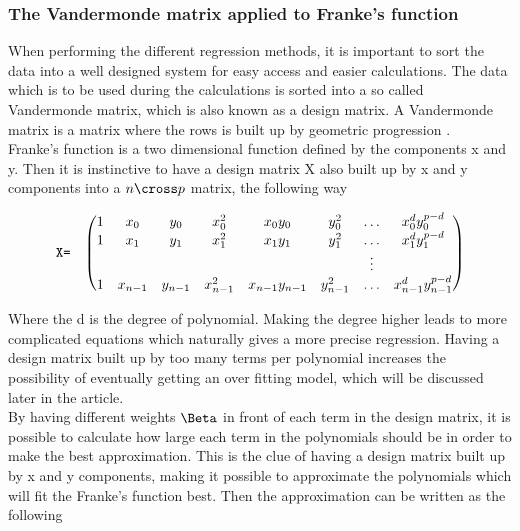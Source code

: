 \subsubsection{The Vandermonde matrix applied to Franke's function}

When performing the different regression methods, it is important to sort the data into a well designed system for easy access and easier calculations. The data which is to be used during the calculations is sorted into a so called Vandermonde matrix, which is also known as a design matrix. A Vandermonde matrix is a matrix where the rows is built up by geometric progression \cite{vandermonde}.\\

Franke's function is a two dimensional function defined by the components x and y. Then it is instinctive to have a design matrix X also built up by x and y components into a $n\cross p$ matrix, the following way

\[
\begin{array}{lccccccc}
  \verb|X=| & \left(\begin{array}{@{}cccccccc@{}}
   1& x_0 & y_0 & x_0^2 & x_0y_0 & y_0^2 & \ldots & x_0^d y_0^{p-d}\\
    1& x_1 & y_1 & x_1^2 & x_1y_1 & y_1^2 & \ldots & x_1^d y_1^{p-d}\\
    & &  &  &  &  & \vdots & \\
    1 & x_{n-1} & y_{n-1} & x_{n-1}^2 & x_{n-1}y_{n-1} & y_{n-1}^2 & \ldots & x_{n-1}^d y_{n-1}^{p-d}\\
 \end{array}\right) \\[15pt]
\end{array}
\]

Where the d is the degree of polynomial. Making the degree higher leads to more complicated equations which naturally gives a more precise regression. Having a design matrix built up by too many terms per polynomial increases the possibility of eventually getting an over fitting model, which will be discussed later in the article.\\

By having different weights $\Beta$ in front of each term in the design matrix, it is possible to calculate how large each term in the polynomials should be in order to make the best approximation. This is the clue of having a design matrix built up by x and y components, making it possible to approximate the polynomials which will fit the Franke's function best. Then the approximation can be written as the following

